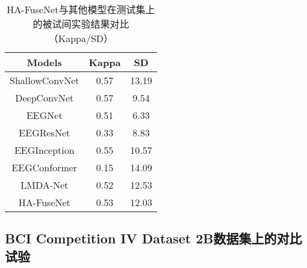 \begin{table}[ht]
    \centering
    \caption{HA-FuseNet与其他模型在测试集上的被试间实验结果对比（Kappa/SD）}
    \label{tab:2acomparecrosssd}
    \begin{tabularx}{\textwidth}{CCC}
      \toprule
      Models & Kappa & SD \\
      \midrule
      ShallowConvNet\cite{schirrmeister2017deep} &0.57&13.19 \\
      DeepConvNet\cite{schirrmeister2017deep} &0.57&9.54\\
      EEGNet\cite{lawhern2018eegnet} &0.51& 6.33\\
      EEGResNet\cite{HBM:HBM23730} &0.33&8.83\\
      EEGInception\cite{zhang2021eeg} &0.55&10.57\\
      EEGConformer\cite{song2022eeg}&0.15&14.09 \\
      LMDA-Net\cite{miao2023lmda} &0.52&12.53\\
      \midrule 
      HA-FuseNet &0.53&12.03\\
      \bottomrule
    \end{tabularx}
\end{table}


\subsection{BCI Competition IV Dataset 2B数据集上的对比试验}

